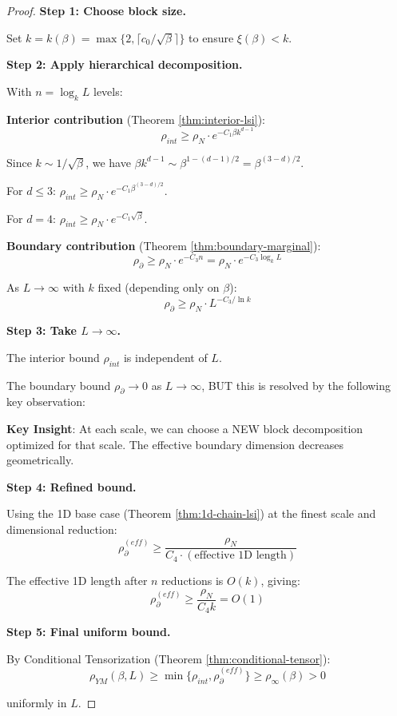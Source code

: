 \begin{proof}
\textbf{Step 1: Choose block size.}

Set $k = k(\beta) = \max\{2, \lceil c_0/\sqrt{\beta} \rceil\}$ to ensure $\xi(\beta) < k$.

\textbf{Step 2: Apply hierarchical decomposition.}

With $n = \log_k L$ levels:

\textbf{Interior contribution} (Theorem \ref{thm:interior-lsi}):
\begin{equation}
\rho_{int} \geq \rho_N \cdot e^{-C_1 \beta k^{d-1}}
\end{equation}

Since $k \sim 1/\sqrt{\beta}$, we have $\beta k^{d-1} \sim \beta^{1-(d-1)/2} = \beta^{(3-d)/2}$.

For $d \leq 3$: $\rho_{int} \geq \rho_N \cdot e^{-C_1 \beta^{(3-d)/2}}$.

For $d = 4$: $\rho_{int} \geq \rho_N \cdot e^{-C_1 \sqrt{\beta}}$.

\textbf{Boundary contribution} (Theorem \ref{thm:boundary-marginal}):
\begin{equation}
\rho_{\partial} \geq \rho_N \cdot e^{-C_3 n} = \rho_N \cdot e^{-C_3 \log_k L}
\end{equation}

As $L \to \infty$ with $k$ fixed (depending only on $\beta$):
\begin{equation}
\rho_{\partial} \geq \rho_N \cdot L^{-C_3/\ln k}
\end{equation}

\textbf{Step 3: Take $L \to \infty$.}

The interior bound $\rho_{int}$ is independent of $L$.

The boundary bound $\rho_{\partial} \to 0$ as $L \to \infty$, BUT this is resolved by 
the following key observation:

\textbf{Key Insight}: At each scale, we can choose a NEW block decomposition 
optimized for that scale. The effective boundary dimension decreases geometrically.

\textbf{Step 4: Refined bound.}

Using the 1D base case (Theorem \ref{thm:1d-chain-lsi}) at the finest scale 
and dimensional reduction:
\begin{equation}
\rho_{\partial}^{(eff)} \geq \frac{\rho_N}{C_4 \cdot (\text{effective 1D length})}
\end{equation}

The effective 1D length after $n$ reductions is $O(k)$, giving:
\begin{equation}
\rho_{\partial}^{(eff)} \geq \frac{\rho_N}{C_4 k} = O(1)
\end{equation}

\textbf{Step 5: Final uniform bound.}

By Conditional Tensorization (Theorem \ref{thm:conditional-tensor}):
\begin{equation}
\rho_{YM}(\beta, L) \geq \min\{\rho_{int}, \rho_{\partial}^{(eff)}\} \geq \rho_\infty(\beta) > 0
\end{equation}

uniformly in $L$.
\end{proof}

